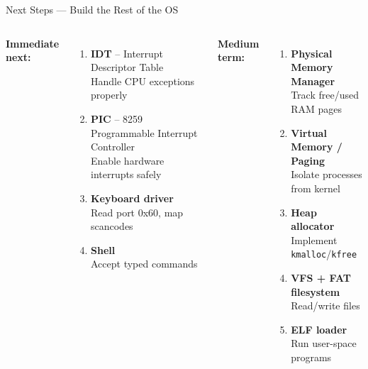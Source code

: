 \documentclass[aspectratio=169]{beamer}
\begin{document}
\begin{frame}{Next Steps --- Build the Rest of the OS}
  \begin{columns}
    \textbf{Immediate next:}
    \begin{enumerate}
      \item \textbf{IDT} -- Interrupt Descriptor Table\\
        Handle CPU exceptions properly
      \item \textbf{PIC} -- 8259 Programmable Interrupt Controller\\
        Enable hardware interrupts safely
      \item \textbf{Keyboard driver}\\
        Read port 0x60, map scancodes
      \item \textbf{Shell}\\
        Accept typed commands
    \end{enumerate}
    \textbf{Medium term:}
    \begin{enumerate}
      \item \textbf{Physical Memory Manager}\\
        Track free/used RAM pages
      \item \textbf{Virtual Memory / Paging}\\
        Isolate processes from kernel
      \item \textbf{Heap allocator}\\
        Implement \texttt{kmalloc}/\texttt{kfree}
      \item \textbf{VFS + FAT filesystem}\\
        Read/write files
      \item \textbf{ELF loader}\\
        Run user-space programs
    \end{enumerate}
  \end{columns}
\end{frame}
\end{document}
